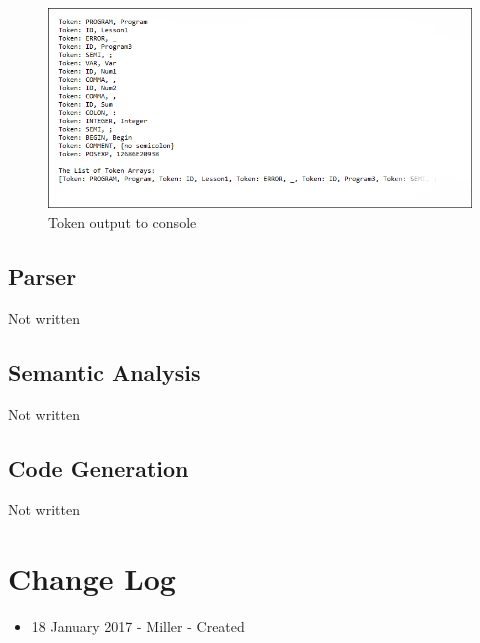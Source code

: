 \documentclass[english]{article}
\begin{document}
\begin{figure}
\begin{center}
\includegraphics[width=1.1\textwidth]{output.PNG}
\end{center}
\caption{\label{Output}Token output to console}
\end{figure}


\subsection{Parser}

Not written

\subsection{Semantic Analysis}

Not written

\subsection{Code Generation}

Not written



\section{Change Log}

\begin{itemize}
\item
18 January 2017 - Miller - Created

\end{itemize}
\end{document}
